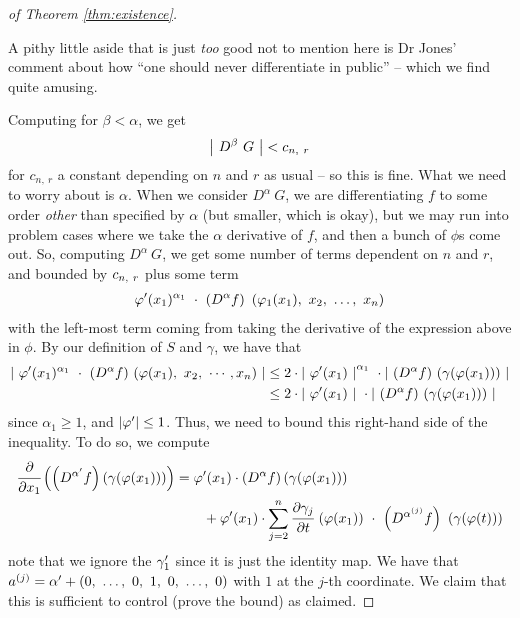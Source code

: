 \begin{proof}[of Theorem \ref{thm:existence}]
    \begin{svgraybox}
      A pithy little aside that is just \emph{too} good not to mention here is Dr Jones' comment about how ``one should never differentiate in public'' -- which we find quite amusing.
    \end{svgraybox}

    Computing for $\beta < \alpha$, we get
      \begin{align*}
        \left\vert \ D^{\beta} \ G \ \right\vert < c_{n, \ r}
      \end{align*}
    for $c_{n, \ r}$ a constant depending on $n$ and $r$ as usual -- so this is fine. What we need to worry about is $\alpha$. When we consider $D^{\alpha} \ G$, we are differentiating $f$ to some order \emph{other} than specified by $\alpha$ (but smaller, which is okay), but we may run into problem cases where we take the $\alpha$ derivative of $f$, and then a bunch of $\phi$s come out. So, computing $D^{\alpha} \ G$, we get some number of terms dependent on $n$ and $r$, and bounded by $c_{n, \ r}$ plus some term
      \begin{align*}
        \varphi^{\prime}(x_1)^{\alpha_1} \ \cdot \ \left( D^{\alpha} f \right) \ (\varphi_1(x_1), \ x_2, \ \hdots, \ x_n)
      \end{align*}
    with the left-most term coming from taking the derivative of the expression above in $\phi$. By our definition of $S$ and $\gamma$, we have that
      \begin{align*}
        \left\vert \  \pri{\phi}(x_1)^{\alpha_1} \ \cdot \ (D^{\alpha} f) \ (\phi(x_1), \ x_2, \ \cdots, x_n) \ \right\vert &\leq 2 \cdot \left\vert \ \pri{\phi}(x_1) \ \right\vert^{\alpha_1} \ \cdot \left\vert \ (D^{\alpha} f) \ (\gamma(\phi(x_1))) \ \right\vert \\
                    &\leq 2 \cdot \left\vert \ \pri{\phi}(x_1) \ \right\vert \ \cdot \left\vert \ (D^{\alpha} f) \ (\gamma(\phi(x_1))) \ \right\vert
      \end{align*}
    since $\alpha_1 \geq 1$, and $\vert\varphi^{\prime}\vert \leq 1$. Thus, we need to bound this right-hand side of the inequality. To do so, we compute
      \begin{align}
        \cfrac{\partial}{\partial x_1} \left( \left( D^{\alpha^{\prime}} f \right) \left( \gamma (\varphi(x_1)) \right) \right) &= \varphi^{\prime}(x_1) \cdot \left( D^{\alpha} f \right) \left( \gamma (\varphi(x_1)) \right) \label{eqn:param_deriv_1} \\
        &\quad \quad+ \varphi^{\prime}(x_1) \cdot \sum_{j=2}^{n} \cfrac{\partial \gamma_j}{\partial t} \ (\varphi(x_1)) \ \cdot \ \left( D^{{\alpha}^{(j)}} f \right) \ \left( \gamma(\varphi(t)) \right)
        \label{eqn:param_deriv_2}
      \end{align}
    note that we ignore the $\gamma_1^{\prime}$ since it is just the identity map. We have that $a^{(j)} = \alpha^{\prime} + (0, \ \hdots, \ 0, \ 1, \ 0, \ \hdots, \ 0)$ with $1$ at the $j$-th coordinate. We claim that this is sufficient to control (prove the bound) as claimed.


\end{proof}
